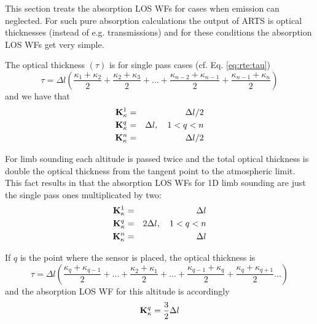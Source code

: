  \label{sec:wfuns:absloswfs2}

 This section treats the absorption LOS WFs for cases when emission
 can neglected. For such pure absorption calculations the output
 of ARTS is optical thicknesses (instead of e.g. transmissions) and
 for these conditions the absorption LOS WFs get very simple.

 The optical thickness $(\tau)$ is for single pass cases (cf. Eq. 
 \ref{eq:rte:tau})
 \begin{equation}
   \tau = \Delta l \left( \frac{\kappa_1+\kappa_2}{2} +
                          \frac{\kappa_2+\kappa_3}{2} + \dots +
                          \frac{\kappa_{n-2}+\kappa_{n-1}}{2} +
                          \frac{\kappa_{n-1}+\kappa_n}{2} \right)
 \end{equation}
 and we have that
 \begin{eqnarray}
   \mathbf{K}_{\kappa}^1& = & \Delta l / 2 \nonumber \\
   \mathbf{K}_{\kappa}^q& = & \Delta l, \quad 1<q<n  \\
   \mathbf{K}_{\kappa}^n& = & \Delta l / 2 \nonumber
 \end{eqnarray}


 For limb sounding each altitude is passed twice and the total optical 
 thickness is double the optical thickness from the tangent point to the
 atmospheric limit. This fact results in that the absorption LOS WFs
 for 1D limb sounding are just the single pass ones multiplicated by two:
 \begin{eqnarray}
   \mathbf{K}_{\kappa}^1& = & \Delta l  \nonumber \\
   \mathbf{K}_{\kappa}^q& = & 2 \Delta l, \quad 1<q<n  \\
   \mathbf{K}_{\kappa}^n& = & \Delta l  \nonumber
 \end{eqnarray}
 

 If $q$ is the point where the sensor is placed, the optical thickness
 is
 \begin{equation}
   \tau = \Delta l \left( \frac{\kappa_q+\kappa_{q-1}}{2} + \dots+
                          \frac{\kappa_2+\kappa_1}{2} + \dots +
                          \frac{\kappa_{q-1}+\kappa_q}{2} +
                          \frac{\kappa_q+\kappa_{q+1}}{2} \dots \right)
 \end{equation}
 and the absorption LOS WF for this altitude is accordingly
 \begin{equation}
   \mathbf{K}_{\kappa}^q =  \frac{3}{2} \Delta l
 \end{equation}






